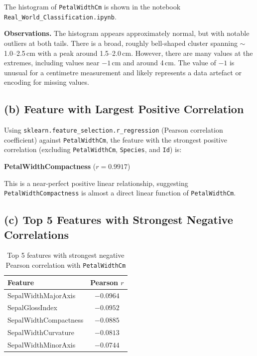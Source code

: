 \documentclass[11pt,a4paper]{article}
\begin{document}
The histogram of \texttt{PetalWidthCm} is shown in the notebook \texttt{Real\_World\_Classification.ipynb}.

\textbf{Observations.}
The histogram appears approximately normal, but with notable outliers at both tails. There is a broad, roughly bell-shaped cluster spanning $\sim$1.0--2.5\,cm with a peak around 1.5--2.0\,cm. However, there are many values at the extremes, including values near $-1$\,cm and around 4\,cm. The value of $-1$ is unusual for a centimetre measurement and likely represents a data artefact or encoding for missing values.

\subsection{(b) Feature with Largest Positive Correlation}

Using \texttt{sklearn.feature\_selection.r\_regression} (Pearson correlation coefficient) against \texttt{PetalWidthCm}, the feature with the strongest positive correlation (excluding \texttt{PetalWidthCm}, \texttt{Species}, and \texttt{Id}) is:

\begin{center}
\textbf{PetalWidthCompactness} \quad ($r = 0.9917$)
\end{center}

This is a near-perfect positive linear relationship, suggesting \texttt{PetalWidthCompactness} is almost a direct linear function of \texttt{PetalWidthCm}.

\subsection{(c) Top 5 Features with Strongest Negative Correlations}

\begin{table}[H]
\centering
\caption{Top 5 features with strongest negative Pearson correlation with \texttt{PetalWidthCm}}
\label{tab:neg_corr}
\begin{tabular}{lc}
\toprule
\textbf{Feature} & \textbf{Pearson $r$} \\
\midrule
SepalWidthMajorAxis   & $-0.0964$ \\
SepalGlossIndex       & $-0.0952$ \\
SepalWidthCompactness & $-0.0885$ \\
SepalWidthCurvature   & $-0.0813$ \\
SepalWidthMinorAxis   & $-0.0744$ \\
\bottomrule
\end{tabular}
\end{table}
\end{document}

